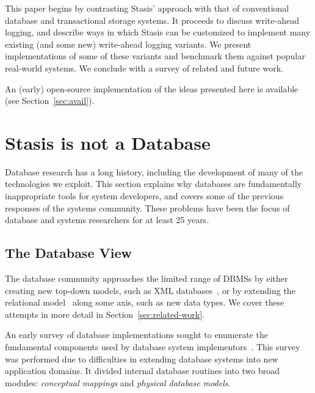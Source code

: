 \documentclass[letterpaper,twocolumn,10pt]{article}
\newcommand{\yad}{Stasis\xspace}
\newcommand{\yads}{Stasis'\xspace}
\newcommand{\eab}[1]{\textcolor{red}{\bf EAB: #1}}
\begin{document}

This paper begins by contrasting \yads approach with that of
conventional database and transactional storage systems.  It proceeds
to discuss write-ahead logging, and describe ways in which \yad can be
customized to implement many existing (and some new) write-ahead
logging variants.  We present implementations of some of these variants and
benchmark them against popular real-world systems.  We
conclude with a survey of related and future work.

An (early) open-source implementation of
the ideas presented here is available (see Section~\ref{sec:avail}).

\section{\yad is not a Database}
\label{sec:notDB}

Database research has a long history, including the development of
many of the technologies we exploit.  This section explains
why databases are fundamentally inappropriate tools for system
developers, and covers some of the previous responses of the systems
community.  These problems have been the focus of
database and systems researchers for at least 25 years.

\subsection{The Database View}

The database community approaches the limited range of DBMSs by either
creating new top-down models, such as XML databases~\cite{XMLdb}, 
or by extending the relational model~\cite{codd} along some axis, such
as new data types.  We cover these attempts in more detail in
Section~\ref{sec:related-work}.


An early survey of database implementations sought to enumerate the
fundamental components used by database system implementors~\cite{batoryConceptual,batoryPhysical}.  This
survey was performed due to difficulties in extending database systems
into new application domains.  It divided internal database
routines into two broad modules: {\em conceptual mappings} and {\em physical
database models}.
\end{document}
